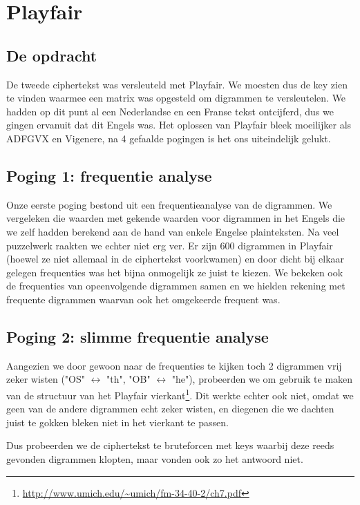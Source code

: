 
\section{Playfair}
\subsection{De opdracht}
De tweede ciphertekst was versleuteld met Playfair. We moesten dus de key zien te vinden waarmee een matrix was opgesteld om digrammen te versleutelen. We hadden op dit punt al een Nederlandse en een Franse tekst ontcijferd, dus we gingen ervanuit dat dit Engels was. 
Het oplossen van Playfair bleek moeilijker als ADFGVX en Vigenere, na 4 gefaalde pogingen is het ons uiteindelijk gelukt.

\subsection{Poging 1: frequentie analyse}
Onze eerste poging bestond uit een frequentieanalyse van de digrammen. We vergeleken die waarden met gekende waarden voor digrammen in het Engels die we zelf hadden berekend aan de hand van enkele Engelse plainteksten. Na veel puzzelwerk raakten we echter niet erg ver. Er zijn 600 digrammen in Playfair (hoewel ze niet allemaal in de ciphertekst voorkwamen) en door dicht bij elkaar gelegen frequenties was het bijna onmogelijk ze juist te kiezen. We bekeken ook de frequenties van opeenvolgende digrammen samen en we hielden rekening met frequente digrammen waarvan ook het omgekeerde frequent was.

\subsection{Poging 2: slimme frequentie analyse}
Aangezien we door gewoon naar de frequenties te kijken toch 2 digrammen vrij zeker wisten ("OS" $\leftrightarrow$ "th", "OB" $\leftrightarrow$ "he"), probeerden we om gebruik te maken van de structuur van het Playfair vierkant\footnote{\url{http://www.umich.edu/~umich/fm-34-40-2/ch7.pdf}}. Dit werkte echter ook niet, omdat we geen van de andere digrammen echt zeker wisten, en diegenen die we dachten juist te gokken bleken niet in het vierkant te passen.

Dus probeerden we de ciphertekst te bruteforcen met keys waarbij deze reeds gevonden digrammen klopten, maar vonden ook zo het antwoord niet.
 
